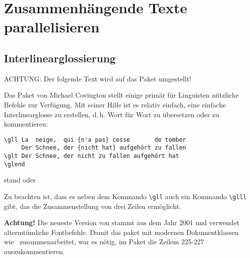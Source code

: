 \chapter{Zusammenhängende Texte parallelisieren}

\section{Interlinearglossierung}


ACHTUNG: Der folgende Text wird auf das Paket  umgestellt!

Das Paket  von Michael Covington stellt einige primär für Linguisten nützliche
Befehle zur Verfügung. Mit seiner Hilfe ist es relativ einfach, eine einfache 
Interlinearglosse zu erstellen, d.\,h. Wort für Wort zu übersetzen oder zu kommentieren:

\begin{lstlisting}
\gll La  neige,  qui {n'a pas} cesse       de tomber 
     Der Schnee, der {nicht hat} aufgehört zu fallen 
\glt Der Schnee, der nicht zu fallen aufgehört hat
\glend 
\end{lstlisting}
stand oder

Zu beachten ist, dass es neben dem Kommando \lstinline/\gll/ auch ein Kommando 
\lstinline/\glll/ gibt, das die Zusammenstellung von drei Zeilen ermöglicht.

\textbf{Achtung!} Die neueste Version von  stammt aus dem Jahr 
2001 und verwendet altermtümliche Fontbefehle. Damit das paket mit modernen Dokumentklassen 
wie \KOMAScript\ zusammenarbeitet, war es nötig, im Paket die Zeilem 225-227 auszukommentieren.
